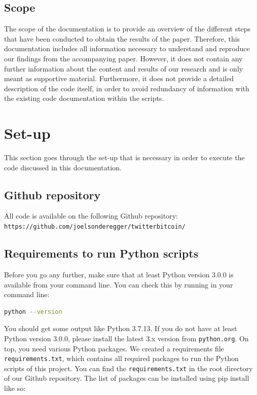 \documentclass[a4paper,12pt]{article}
\begin{document}
\begin{spacing}{1.2}
\subsection{Scope}
The scope of the documentation is to provide an overview of the different steps that have been conducted to obtain the results of the paper. Therefore, this documentation includes all information necessary to understand and reproduce our findings from the accompanying paper. However, it does not contain any further information about the content and results of our research and is only meant as supportive material. Furthermore, it does not provide a detailed description of the code itself, in order to avoid redundancy of information with the existing code documentation within the scripts. 
\clearpage

\section{Set-up}
This section goes through the set-up that is necessary in order to execute the code discussed in this documentation.

\subsection{Github repository}
All code is available on the following Github repository:
\newline
\verb|https://github.com/joelsonderegger/twitterbitcoin/|
\subsection{Requirements to run Python scripts}
Before you go any further, make sure that at least Python version 3.0.0 is available from your command line. You can check this by running in your command line:
\begin{lstlisting}[language=bash]
    python --version
\end{lstlisting}

You should get some output like Python 3.7.13. If you do not have at least Python version 3.0.0, please install the latest 3.x version from \verb|python.org|.
\newline \newline
On top, you need various Python packages. We created a requirements file \verb|requirements.txt|, which contains all required packages to run the Python scripts of this project. You can find the \verb|requirements.txt| in the root directory of our Github repository. The list of packages can be installed using pip install like so:


\end{spacing}
\end{document}
